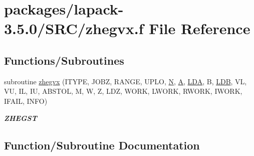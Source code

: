 \hypertarget{zhegvx_8f}{}\section{packages/lapack-\/3.5.0/\+S\+R\+C/zhegvx.f File Reference}
\label{zhegvx_8f}
\subsection*{Functions/\+Subroutines}
\begin{DoxyCompactItemize}
\item 
subroutine \hyperlink{zhegvx_8f_a8ea76cbbb14edb5a22069e203fc8e8b2}{zhegvx} (I\+T\+Y\+P\+E, J\+O\+B\+Z, R\+A\+N\+G\+E, U\+P\+L\+O, \hyperlink{polmisc_8c_a0240ac851181b84ac374872dc5434ee4}{N}, \hyperlink{classA}{A}, \hyperlink{example__user_8c_ae946da542ce0db94dced19b2ecefd1aa}{L\+D\+A}, B, \hyperlink{example__user_8c_a50e90a7104df172b5a89a06c47fcca04}{L\+D\+B}, V\+L, V\+U, I\+L, I\+U, A\+B\+S\+T\+O\+L, M, W, Z, L\+D\+Z, W\+O\+R\+K, L\+W\+O\+R\+K, R\+W\+O\+R\+K, I\+W\+O\+R\+K, I\+F\+A\+I\+L, I\+N\+F\+O)
\begin{DoxyCompactList}\small\item\em {\bfseries Z\+H\+E\+G\+S\+T} \end{DoxyCompactList}\end{DoxyCompactItemize}


\subsection{Function/\+Subroutine Documentation}
\hypertarget{zhegvx_8f_a8ea76cbbb14edb5a22069e203fc8e8b2}{}
